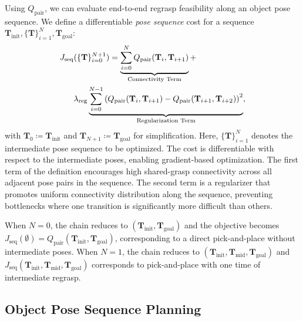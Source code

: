 \documentclass[journal, twoside]{IEEEtran}
\begin{document}
Using $Q_\mathrm{pair}$, we can evaluate end-to-end regrasp feasibility along an object pose sequence. We define a differentiable \textit{pose sequence} cost for a sequence $\mathbf{T}_\mathrm{init}, \{\mathbf{T}\}_{i=1}^{N}, \mathbf{T}_\mathrm{goal}$:
\begin{align}
    J_\mathrm{seq}(\{\mathbf{T}&\}_{i=0}^{N+1}) = \underbrace{\sum_{i=0}^{N} Q_\mathrm{pair}(\mathbf{T}_i, \mathbf{T}_{i+1})}_{\text{Connectivity Term}} + \notag \\ 
    \lambda_{\mathrm{reg}} & \underbrace{\sum_{i=0}^{N-1} \left( Q_\mathrm{pair}(\mathbf{T}_i, \mathbf{T}_{i+1}) - Q_\mathrm{pair}(\mathbf{T}_{i+1}, \mathbf{T}_{i+2}) \right)^2}_{\text{Regularization Term}},
    \label{eq_objective_function}
\end{align}
with $\mathbf{T}_0\coloneq\mathbf{T}_{\mathrm{init}}$ and $\mathbf{T}_{N+1}\coloneq \mathbf{T}_{\mathrm{goal}}$ for simplification. Here, $\{\mathbf{T}\}_{i=1}^{N}$ denotes the intermediate pose sequence to be optimized. The cost is differentiable with respect to the intermediate poses, enabling gradient-based optimization. The first term of the definition encourages high shared-grasp connectivity across all adjacent pose pairs in the sequence. The second term is a regularizer that promotes uniform connectivity distribution along the sequence, preventing bottlenecks where one transition is significantly more difficult than others. 

When $N=0$, the chain reduces to $(\mathbf{T}_{\mathrm{init}},\mathbf{T}_{\mathrm{goal}})$ and the objective becomes $J_\mathrm{seq}(\emptyset)=Q_\mathrm{pair}(\mathbf{T}_{\mathrm{init}},\mathbf{T}_{\mathrm{goal}})$, corresponding to a direct pick-and-place without intermediate poses. When $N=1$, the chain reduces to $(\mathbf{T}_{\mathrm{init}},\mathbf{T}_{\mathrm{mid}},\mathbf{T}_{\mathrm{goal}})$ and $J_\mathrm{seq}(\mathbf{T}_{\mathrm{init}},\mathbf{T}_{\mathrm{mid}},\mathbf{T}_{\mathrm{goal}})$ corresponds to pick-and-place with one time of intermediate regrasp.

\subsection{Object Pose Sequence Planning}
\label{subsec_iterative_planning_method}
\end{document}
